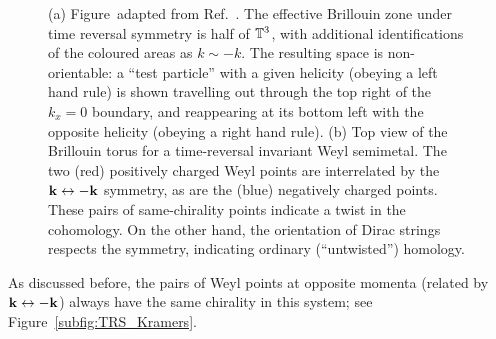 \begin{figure}[htb!]
	\centering
	\hfil
	\caption{(a) Figure~adapted from Ref.~\cite{Thiang_equivariant}. The effective Brillouin zone under time reversal symmetry is half of $\mathbb{T}^3$, with additional identifications of the coloured areas as $k\sim -k$. The resulting space is non-orientable: a ``test particle'' with a given helicity (obeying a left hand rule) is shown travelling out through the top right of the $k_x = 0$ boundary, and reappearing at its bottom left with the opposite helicity (obeying a right hand rule).
		(b) Top view of the Brillouin torus for a time-reversal invariant Weyl semimetal. The two (red) positively charged Weyl points are interrelated by the $\vb{k}\leftrightarrow-\vb{k}$ symmetry, as are the (blue) negatively charged points. These pairs of same-chirality points indicate a twist in the cohomology. On the other hand, the orientation of Dirac strings respects the symmetry, indicating ordinary (``untwisted'') homology.}
	\label{fig:TRS_twist}
\end{figure}
As discussed before, the pairs of Weyl points at opposite momenta (related by $\vb{k}\leftrightarrow -\vb{k}$) always have the same chirality in this system; see Figure~\ref{subfig:TRS_Kramers}.  %
